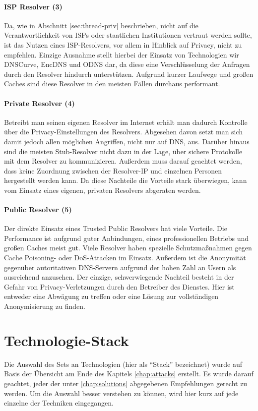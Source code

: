 \paragraph{ISP Resolver (3)}
Da, wie in Abschnitt \ref{sec:thread-priv} beschrieben, nicht auf die Verantwortlichkeit von ISPs oder staatlichen Institutionen vertraut werden sollte, ist das Nutzen eines ISP-Resolvers, vor allem in Hinblick auf Privacy, nicht zu empfehlen. Einzige Ausnahme stellt hierbei der Einsatz von Technologien wir DNSCurve, EncDNS und ODNS dar, da diese eine Verschlüsselung der Anfragen durch den Resolver hindurch unterstützen. Aufgrund kurzer Laufwege und großen Caches sind diese Resolver in den meisten Fällen durchaus performant.

\paragraph{Private Resolver (4)}
Betreibt man seinen eigenen Resolver im Internet erhält man dadurch Kontrolle über die Privacy-Einstellungen des Resolvers. Abgesehen davon setzt man sich damit jedoch allen möglichen Angriffen, nicht nur auf DNS, aus. Darüber hinaus sind die meisten Stub-Resolver nicht dazu in der Lage, über sichere Protokolle mit dem Resolver zu kommunizieren. Außerdem muss darauf geachtet werden, dass keine Zuordnung zwischen der Resolver-IP und einzelnen Personen hergestellt werden kann. Da diese Nachteile die Vorteile stark überwiegen, kann vom Einsatz eines eigenen, privaten Resolvers abgeraten werden.

\paragraph{Public Resolver (5)}
Der direkte Einsatz eines Trusted Public Resolvers hat viele Vorteile. Die Performance ist aufgrund guter Anbindungen, eines professionellen Betriebs und großen Caches meist gut. Viele Resolver haben spezielle Schutzmaßnahmen gegen Cache Poisoning- oder DoS-Attacken im Einsatz. Außerdem ist die Anonymität gegenüber autoritativen DNS-Servern aufgrund der hohen Zahl an Usern als ausreichend anzusehen. Der einzige, schwerwiegende Nachteil besteht in der Gefahr von Privacy-Verletzungen durch den Betreiber des Dienstes. Hier ist entweder eine Abwägung zu treffen oder eine Lösung zur vollständigen Anonymisierung zu finden. 

\section{Technologie-Stack}
Die Auswahl des Sets an Technologien (hier als ``Stack'' bezeichnet) wurde auf Basis der Übersicht am Ende des Kapitels \ref{chap:attacks} erstellt. Es wurde darauf geachtet, jeder der unter \ref{chap:solutions} abgegebenen Empfehlungen gerecht zu werden. Um die Auswahl besser verstehen zu können, wird hier kurz auf jede einzelne der Techniken eingegangen.

